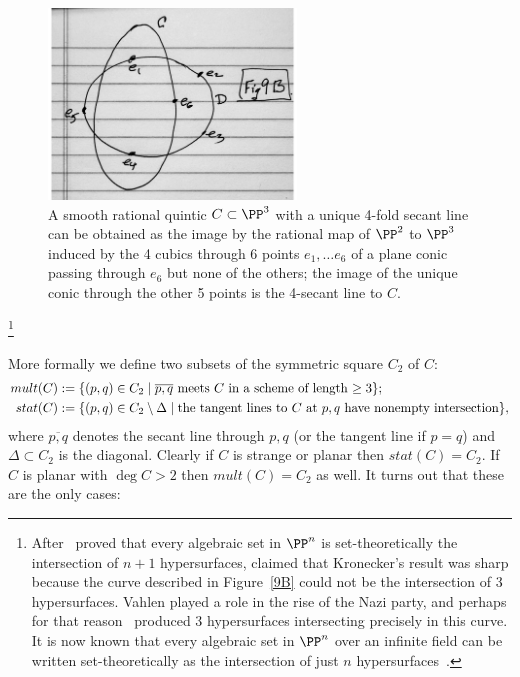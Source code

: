 \begin{figure}
\begin{center}
\centerline {\includegraphics[height=2in]{"Fig9B.pdf"}}
\caption{A smooth rational quintic $C \subset \PP^{3}$ with a unique 4-fold secant line
can be obtained as the image by the rational map of $\PP^{2}$ to $\PP^{3}$
induced by the 4 cubics through 6 points $e_{1},\dots e_{6}$ of a plane conic
passing through $e_{6}$ but none of the others; the image of the unique conic through the
other 5 points is the 4-secant line to $C$.}
\label{Fig9B}
\end{center}
\end{figure}
\footnote{After~\cite{Kronecker} proved that every algebraic set in $\PP^{n}$ is set-theoretically the intersection of $n+1$ hypersurfaces, \cite{Vahlen} claimed that Kronecker's result was sharp because the curve described in Figure~\ref{9B} could not be the intersection of 3 hypersurfaces. Vahlen played a role in the rise of the Nazi party, and perhaps for that reason~\cite{Perron} produced 3 hypersurfaces intersecting precisely in this curve. It is now known that every algebraic set in $\PP^{n}$ over an infinite field can be written set-theoretically as the intersection of just $n$ hypersurfaces~\cite{Eisenbud-Evans}.
}


More formally we define two subsets of the symmetric square $C_2$ of $C$:
$$
\begin{aligned}
 mult(C) &:=\{(p,q) \in C_2 \mid \overline{p,q} \hbox{ meets $C$ in a scheme of length $\geq 3$}\};\\
stat(C) &:= \{(p,q) \in C_2\setminus \Delta \mid  \hbox{the tangent lines to $C$ at $p,q$ have nonempty intersection}\},
\end{aligned}
$$
where $\overline{p,q}$ denotes the secant line through $p,q$ (or the tangent line if $p=q$) and $\Delta\subset C_2$
is the diagonal.
Clearly if $C$ is strange or planar then $stat(C) = C_2$. If $C$ is planar with $\deg C>2$ then $mult(C) = C_2$ as well.
It turns out that these are the only cases:

